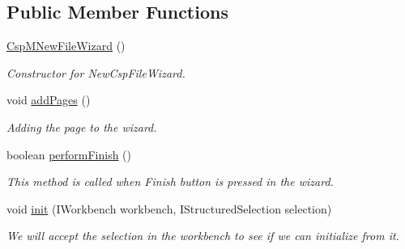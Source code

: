 \subsection*{Public Member Functions}
\begin{DoxyCompactItemize}
\item 
\mbox{\label{classcom_1_1fware_1_1cspdt_1_1cspm_1_1editor_1_1wizards_1_1_csp_m_new_file_wizard_ae414a510ec5ecf2edc0cdeb1f4b6a853}} 
\hyperlink{classcom_1_1fware_1_1cspdt_1_1cspm_1_1editor_1_1wizards_1_1_csp_m_new_file_wizard_ae414a510ec5ecf2edc0cdeb1f4b6a853}{Csp\+M\+New\+File\+Wizard} ()
\begin{DoxyCompactList}\small\item\em Constructor for New\+Csp\+File\+Wizard. \end{DoxyCompactList}\item 
\mbox{\label{classcom_1_1fware_1_1cspdt_1_1cspm_1_1editor_1_1wizards_1_1_csp_m_new_file_wizard_a8f768f91606a656c10398eeba7f37c30}} 
void \hyperlink{classcom_1_1fware_1_1cspdt_1_1cspm_1_1editor_1_1wizards_1_1_csp_m_new_file_wizard_a8f768f91606a656c10398eeba7f37c30}{add\+Pages} ()
\begin{DoxyCompactList}\small\item\em Adding the page to the wizard. \end{DoxyCompactList}\item 
boolean \hyperlink{classcom_1_1fware_1_1cspdt_1_1cspm_1_1editor_1_1wizards_1_1_csp_m_new_file_wizard_a83fd26a7b1d353930d84a355aa267dfd}{perform\+Finish} ()
\begin{DoxyCompactList}\small\item\em This method is called when \textquotesingle{}Finish\textquotesingle{} button is pressed in the wizard. \end{DoxyCompactList}\item 
void \hyperlink{classcom_1_1fware_1_1cspdt_1_1cspm_1_1editor_1_1wizards_1_1_csp_m_new_file_wizard_a0ec12d138963ca85e6f709a5e45eeb81}{init} (I\+Workbench workbench, I\+Structured\+Selection selection)
\begin{DoxyCompactList}\small\item\em We will accept the selection in the workbench to see if we can initialize from it. \end{DoxyCompactList}\end{DoxyCompactItemize}


